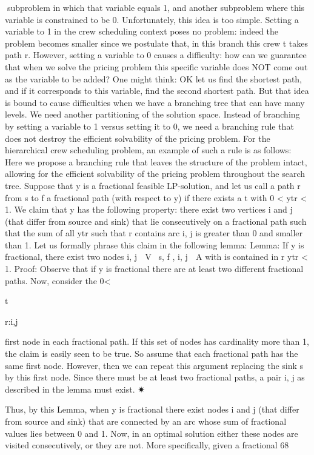 subproblem in which that variable equals 1, and another subproblem where this variable is constrained to
be 0. Unfortunately, this idea is too simple. Setting a variable to 1 in the crew scheduling context poses
no problem: indeed the problem becomes smaller since we postulate that, in this branch this crew t takes
path r. However, setting a variable to 0 causes a difficulty: how can we guarantee that when we solve
the pricing problem this specific variable does NOT come out as the variable to be added? One might
think: OK let us find the shortest path, and if it corresponds to this variable, find the second shortest
path. But that idea is bound to cause difficulties when we have a branching tree that can have many
levels.
We need another partitioning of the solution space. Instead of branching by setting a variable to 1 versus
setting it to 0, we need a branching rule that does not destroy the efficient solvability of the pricing
problem. For the hierarchical crew scheduling problem, an example of such a rule is as follows: Here
we propose a branching rule that leaves the structure of the problem intact, allowing for the efficient
solvability of the pricing problem throughout the search tree.
Suppose that y is a fractional feasible LP-solution, and let us call a path r from s to f a fractional path
(with respect to y) if there exists a t with 0 < ytr < 1. We claim that y has the following property: there
exist two vertices i and j (that differ from source and sink) that lie consecutively on a fractional path
such that the sum of all ytr such that r contains arc {i, j} is greater than 0 and smaller than 1. Let us
formally phrase this claim in the following lemma:
Lemma: If y is fractional, there exist two nodes i, j ∈ V \ {s, f }, {i, j} ∈ A with
is contained in r ytr < 1.
Proof: Observe that if y is fractional there are at least two different fractional paths. Now, consider the
0<

t

r:{i,j}

first node in each fractional path. If this set of nodes has cardinality more than 1, the claim is easily seen
to be true. So assume that each fractional path has the same first node. However, then we can repeat
this argument replacing the sink s by this first node. Since there must be at least two fractional paths,
a pair i, j as described in the lemma must exist.
✷

Thus, by this Lemma, when y is fractional there exist nodes i and j (that differ from source and sink)
that are connected by an arc whose sum of fractional values lies between 0 and 1. Now, in an optimal
solution either these nodes are visited consecutively, or they are not. More specifically, given a fractional
68

